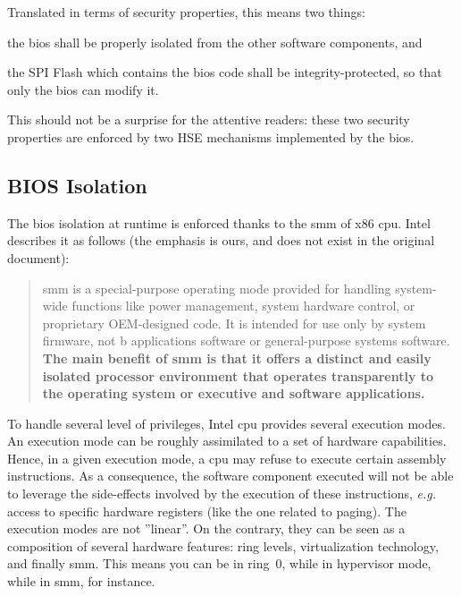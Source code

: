 Translated in terms of security properties, this means two things:
%
\begin{inparaenum}[(1)]
\item the \ac{bios} shall be properly isolated from the other software
  components, and
\item the SPI Flash which contains the \ac{bios} code shall be
  integrity-protected, so that only the \ac{bios} can modify it.
\end{inparaenum}
%
This should not be a surprise for the attentive readers: these two security
properties are enforced by two HSE mechanisms implemented by the \ac{bios}.

\subsection{BIOS Isolation}

The \ac{bios} isolation at runtime is enforced thanks to the \ac{smm} of x86
\ac{cpu}.
%
Intel describes it as follows (the emphasis is ours, and does not exist in the
original document):

\begin{quote}
  \ac{smm} is a special-purpose operating mode provided for handling system-wide
  functions like power management, system hardware control, or proprietary
  OEM-designed code.
  It is intended for use only by system firmware, not b applications software or
  general-purpose systems software.
  \textbf{The main benefit of \ac{smm} is that it offers a distinct and easily
    isolated processor environment that operates transparently to the operating
    system or executive and software applications.}
\end{quote}

To handle several level of privileges, Intel \ac{cpu} provides several execution
modes.
%
An execution mode can be roughly assimilated to a set of hardware capabilities.
%
Hence, in a given execution mode, a \ac{cpu} may refuse to execute certain
assembly instructions.
%
As a consequence, the software component executed will not be able to leverage
the side-effects involved by the execution of these instructions, \emph{e.g.}
access to specific hardware registers (like the one related to paging).
%
The execution modes are not ''linear''.
%
On the contrary, they can be seen as a composition of several hardware features:
ring levels, virtualization technology, and finally \ac{smm}.
%
This means you can be in ring~0, while in hypervisor mode, while in \ac{smm},
for instance.

